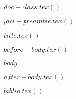 
%

$doc-class.tex()$


\usepackage{times,latexsym}
\usepackage{url}
\usepackage[T1]{fontenc}

$_tacl-preamble.tex()$


$title.tex()$



$before-body.tex()$

$body$

$after-body.tex()$

$biblio.tex()$





